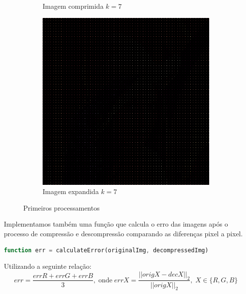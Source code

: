\documentclass[12pt, a4paper]{article}
\begin{document}
\begin{figure}[h]
\begin{subfigure}{.3\textwidth}
            \caption{Imagem comprimida $k=7$}
        \end{subfigure}
        \begin{subfigure}{.3\textwidth}
            \includegraphics[width=.95\textwidth]{../lenaexp7.png}
            \caption{Imagem expandida $k=7$}
        \end{subfigure}
        \caption{Primeiros processamentos}
    \end{figure}

    Implementamos também uma função que calcula o erro das imagens após o processo
    de compressão e descompressão comparando as diferenças pixel a pixel.
    \begin{lstlisting}[language=Octave]
        function err = calculateError(originalImg, decompressedImg)
    \end{lstlisting}
    Utilizando a seguinte relação:
    \begin{equation*}
        err = \frac{errR + errG + errB}{3},\; \text{onde} \;
        errX = \frac{||origX - decX||_{2}}{||origX||_{2}}, \;
        X \in \{R, G, B\}
    \end{equation*}

\newpage
\end{document}
